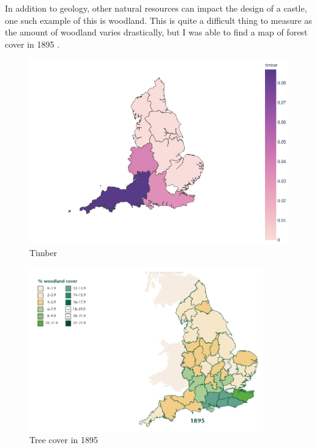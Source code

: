 \documentclass[11pt]{article}
\begin{document}
In addition to geology, other natural resources can impact the design of a castle, one such example of this is woodland. This is quite a difficult thing to measure as the amount of woodland varies drastically, but I was able to find a map of forest cover in 1895 \cite{trees}.

\begin{minipage}{0.45\textwidth}
	\begin{figure}[H]
		\centering
		\includegraphics[width=\textwidth]{timber.png}
		\caption{Timber}
	\end{figure}
\end{minipage}
\begin{minipage}{0.45\textwidth}
	\begin{figure}[H]
		\centering
		\includegraphics[width=0.9\textwidth]{forest_cover.png}
		\caption{Tree cover in 1895}
	\end{figure}
\end{minipage}
\end{document}
